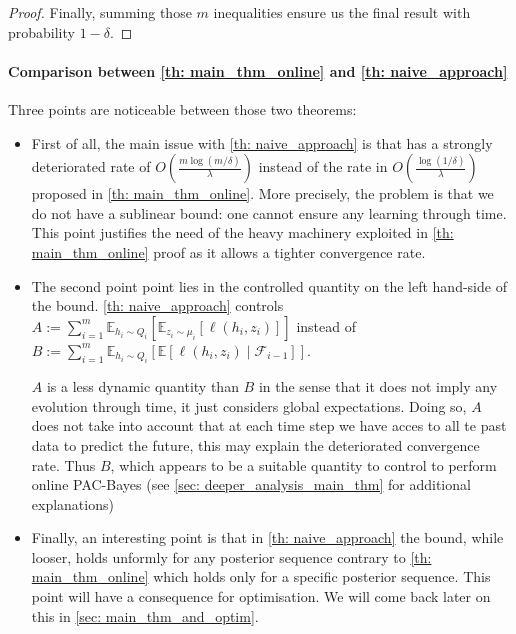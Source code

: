 \begin{noaddcontents}
\begin{proof}
  Finally, summing those $m$ inequalities ensure us the final result with probability $1-\delta$.

\end{proof}

\paragraph{Comparison between \cref{th: main_thm_online} and \cref{th: naive_approach}}   Three points are noticeable between those two theorems:

\begin{itemize}
  \item First of all, the main issue with \cref{th: naive_approach} is that has a strongly deteriorated rate of $O\left(\frac{m\log(m/\delta)}{\lambda} \right)$ instead of the rate in  $O\left(\frac{\log(1/\delta)}{\lambda} \right)$ proposed in \cref{th: main_thm_online}.
  More precisely, the problem is that we do not have a sublinear bound: one cannot ensure any learning through time.
  This point justifies the need of the heavy machinery exploited in \cref{th: main_thm_online} proof as it allows a tighter convergence rate.
  \item The second point point lies in the controlled quantity on the left hand-side of the bound. \cref{th: naive_approach} controls $A:=\sum_{i=1}^m \mathbb{E}_{h_i\sim Q_{i}}\left[ \mathbb{E}_{z_i\sim \mu_i}[\ell(h_i,z_i)]    \right]$
  instead of $B:=\sum_{i=1}^m \mathbb{E}_{h_i\sim Q_{i}}\left[ \mathbb{E}[\ell(h_i,z_i) \mid \mathcal{F}_{i-1}]    \right]$.

  $A$ is a less dynamic quantity than $B$ in the sense that it does not imply any evolution through time, it just considers global expectations. Doing so, $A$ does not take into account that at each time step we have acces to all te past data to predict the future, this may explain the deteriorated convergence rate. Thus $B$, which appears to be a suitable quantity to control to perform online PAC-Bayes (see \cref{sec: deeper_analysis_main_thm} for additional explanations)

  \item Finally, an interesting point is that in \cref{th: naive_approach} the bound, while looser, holds unformly for any posterior sequence contrary to \cref{th: main_thm_online} which holds only for a specific posterior sequence. This point will have a consequence for optimisation. We will come back later on this in \cref{sec: main_thm_and_optim}.
\end{itemize}





\end{noaddcontents}
